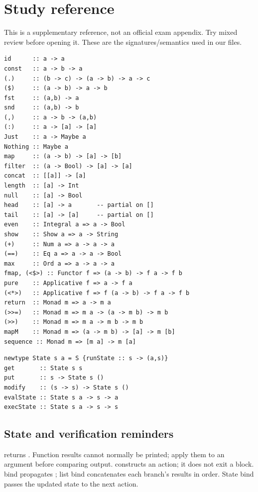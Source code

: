 \chapter{Study reference}
\small
\lstset{basicstyle=\ttfamily\small}
This is a supplementary reference, not an official exam appendix. Try mixed
review before opening it. These are the signatures/semantics used in our files.
\par\noindent\begin{minipage}{\linewidth}
\begin{lstlisting}
id      :: a -> a
const   :: a -> b -> a
(.)     :: (b -> c) -> (a -> b) -> a -> c
($)     :: (a -> b) -> a -> b
fst     :: (a,b) -> a
snd     :: (a,b) -> b
(,)     :: a -> b -> (a,b)
(:)     :: a -> [a] -> [a]
Just    :: a -> Maybe a
Nothing :: Maybe a
map     :: (a -> b) -> [a] -> [b]
filter  :: (a -> Bool) -> [a] -> [a]
concat  :: [[a]] -> [a]
length  :: [a] -> Int
null    :: [a] -> Bool
head    :: [a] -> a       -- partial on []
tail    :: [a] -> [a]     -- partial on []
even    :: Integral a => a -> Bool
show    :: Show a => a -> String
(+)     :: Num a => a -> a -> a
(==)    :: Eq a => a -> a -> Bool
max     :: Ord a => a -> a -> a
fmap, (<$>) :: Functor f => (a -> b) -> f a -> f b
pure    :: Applicative f => a -> f a
(<*>)   :: Applicative f => f (a -> b) -> f a -> f b
return  :: Monad m => a -> m a
(>>=)   :: Monad m => m a -> (a -> m b) -> m b
(>>)    :: Monad m => m a -> m b -> m b
mapM    :: Monad m => (a -> m b) -> [a] -> m [b]
sequence :: Monad m => [m a] -> m [a]
\end{lstlisting}
\end{minipage}\par
\par\noindent\begin{minipage}{\linewidth}
\begin{lstlisting}
newtype State s a = S {runState :: s -> (a,s)}
get       :: State s s
put       :: s -> State s ()
modify    :: (s -> s) -> State s ()
evalState :: State s a -> s -> a
execState :: State s a -> s -> s
\end{lstlisting}
\end{minipage}\par
\clearpage
\section*{State and verification reminders}
 returns . Function results cannot
normally be printed; apply them to an argument before comparing output.
 constructs an action; it does not exit a  block.
 bind propagates ; list bind concatenates each
branch's results in order. State bind passes the updated state to the next action.

